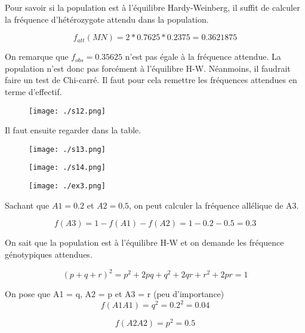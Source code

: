 \documentclass{article}
\begin{document}
Pour savoir si la population est à l'équilibre Hardy-Weinberg, il suffit de calculer la fréquence d'hétérozygote attendu dans la population.

\begin{equation}
f_{att}(MN) = 2 * 0.7625 * 0.2375 = 0.3621875
\end{equation}

On remarque que $f_{obs} = 0.35625$ n'est pas égale à la fréquence attendue. La population n'est donc pas forcément à l'équilibre H-W. Néanmoins, il faudrait faire un test de Chi-carré. Il faut pour cela remettre les fréquences attendues en terme d'effectif.

\begin{figure}[H]
\texttt{[image: ./s12.png]}
\end{figure}

Il faut ensuite regarder dans la table.


\begin{figure}[H]
\texttt{[image: ./s13.png]}
\end{figure}

\begin{figure}[H]
\texttt{[image: ./s14.png]}
\end{figure}

\pagebreak

\begin{figure}[H]
\texttt{[image: ./ex3.png]}
\end{figure}

Sachant que $A1=0.2$ et $A2=0.5$, on peut calculer la fréquence allélique de A3.

\begin{equation}
f(A3) = 1 - f(A1) - f(A2) = 1 - 0.2 - 0.5  = 0.3
\end{equation}

On sait que la population est à l'équilibre H-W et on demande les fréquence génotypiques attendues.

\begin{equation}
(p + q + r)^2 = p^2 + 2pq + q^2 + 2qr + r^2 + 2pr = 1
\end{equation}

On pose que A1 = q, A2 = p et A3 = r (peu d'importance)
\begin{equation}
f(A1A1) = q^2 = 0.2^2 = 0.04
\end{equation}

\begin{equation}
f(A2A2) = p^2 = 0.5 
\end{equation}
\end{document}
